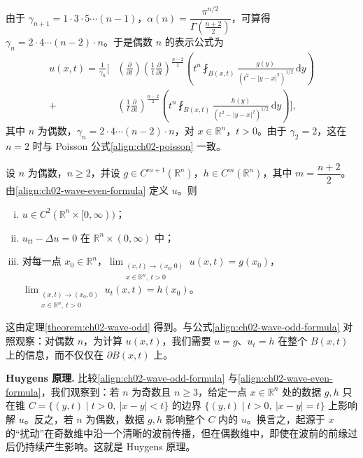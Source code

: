 \documentclass[../../main.tex]{subfiles}
\begin{document}
由于 $\gamma_{n+1}=1\cdot 3\cdot 5\cdots(n-1)$，$\alpha(n)=\dfrac{\pi^{n/2}}{\Gamma(\frac{n+2}{2})}$，可算得 $\gamma_n=2\cdot 4\cdots(n-2)\cdot n$。于是偶数 $n$ 的表示公式为
\begin{align}\label{align:ch02-wave-even-formula}
u(x,t)=\frac{1}{\gamma_n}\Bigg[&\left(\frac{\partial}{\partial t}\right)\left(\frac{1}{t}\frac{\partial}{\partial t}\right)^{\frac{n-2}{2}}\left(t^n\fint_{B(x,t)}\frac{g(y)}{(t^2-|y-x|^2)^{1/2}}\,\mathrm{d}y\right)\\
+&\left(\frac{1}{t}\frac{\partial}{\partial t}\right)^{\frac{n-2}{2}}\left(t^n\fint_{B(x,t)}\frac{h(y)}{(t^2-|y-x|^2)^{1/2}}\,\mathrm{d}y\right)\Bigg],\nonumber
\end{align}
其中 $n$ 为偶数，$\gamma_n=2\cdot 4\cdots(n-2)\cdot n$，对 $x\in\mathbb{R}^n$，$t>0$。由于 $\gamma_2=2$，这在 $n=2$ 时与 Poisson 公式\eqref{align:ch02-poisson} 一致。

\begin{theorem}[偶数维波动方程的解]\label{theorem:ch02-wave-even}设 $n$ 为偶数，$n\geqslant 2$，并设 $g\in C^{m+1}(\mathbb{R}^n)$，$h\in C^m(\mathbb{R}^n)$，其中 $m=\dfrac{n+2}{2}$。由\eqref{align:ch02-wave-even-formula} 定义 $u$。则
\begin{enumerate}[(i)]
\item $u\in C^2(\mathbb{R}^n\times[0,\infty))$；
\item $u_{tt}-\Delta u=0$ 在 $\mathbb{R}^n\times(0,\infty)$ 中；
\item 对每一点 $x_0\in\mathbb{R}^n$，$\displaystyle\lim_{\substack{(x,t)\to(x_0,0)\\x\in\mathbb{R}^n,\ t>0}}u(x,t)=g(x_0)$，$\displaystyle\lim_{\substack{(x,t)\to(x_0,0)\\x\in\mathbb{R}^n,\ t>0}}u_t(x,t)=h(x_0)$。
\end{enumerate}
\end{theorem}

这由定理\cref{theorem:ch02-wave-odd} 得到。与公式\eqref{align:ch02-wave-odd-formula} 对照观察：对偶数 $n$，为计算 $u(x,t)$，我们需要 $u=g$、$u_t=h$ 在整个 $B(x,t)$ 上的信息，而不仅仅在 $\partial B(x,t)$ 上。

\textbf{Huygens 原理.} 比较\eqref{align:ch02-wave-odd-formula} 与\eqref{align:ch02-wave-even-formula}，我们观察到：若 $n$ 为奇数且 $n\geqslant 3$，给定一点 $x\in\mathbb{R}^n$ 处的数据 $g,h$ 只在锥 $C=\{(y,t)\mid t>0,\ |x-y|<t\}$ 的边界 $\{(y,t)\mid t>0,\ |x-y|=t\}$ 上影响解 $u$。反之，若 $n$ 为偶数，数据 $g,h$ 影响整个 $C$ 内的 $u$。换言之，起源于 $x$ 的``扰动''在奇数维中沿一个清晰的波前传播，但在偶数维中，即使在波前的前缘过后仍持续产生影响。这就是 Huygens 原理。
\end{document}
